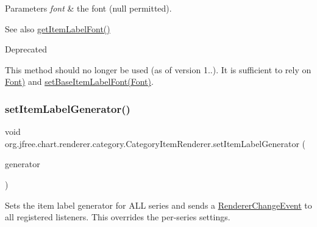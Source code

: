 \begin{DoxyParams}{Parameters}
{\em font} & the font ({\ttfamily null} permitted).\\
\hline
\end{DoxyParams}
\begin{DoxySeeAlso}{See also}
\mbox{\hyperlink{interfaceorg_1_1jfree_1_1chart_1_1renderer_1_1category_1_1_category_item_renderer_a36c3078748754f413db77717d6769872}{get\+Item\+Label\+Font()}}
\end{DoxySeeAlso}
\begin{DoxyRefDesc}{Deprecated}
\item[\mbox{\hyperlink{deprecated__deprecated000171}{Deprecated}}]This method should no longer be used (as of version 1..). It is sufficient to rely on \mbox{\hyperlink{}{Font)}} and \mbox{\hyperlink{interfaceorg_1_1jfree_1_1chart_1_1renderer_1_1category_1_1_category_item_renderer_a46c3636001b01498f6f222a4cbc6878e}{set\+Base\+Item\+Label\+Font(\+Font)}}. \end{DoxyRefDesc}
\mbox{\label{interfaceorg_1_1jfree_1_1chart_1_1renderer_1_1category_1_1_category_item_renderer_a5324b404df0d22be7a5fe117c1da97bf}} 
\subsubsection{\texorpdfstring{set\+Item\+Label\+Generator()}{setItemLabelGenerator()}}
{\footnotesize\ttfamily void org.\+jfree.\+chart.\+renderer.\+category.\+Category\+Item\+Renderer.\+set\+Item\+Label\+Generator (\begin{DoxyParamCaption}\item[{\mbox{\hyperlink{interfaceorg_1_1jfree_1_1chart_1_1labels_1_1_category_item_label_generator}{Category\+Item\+Label\+Generator}}}]{generator }\end{DoxyParamCaption})}

Sets the item label generator for A\+LL series and sends a \mbox{\hyperlink{}{Renderer\+Change\+Event}} to all registered listeners. This overrides the per-\/series settings.


